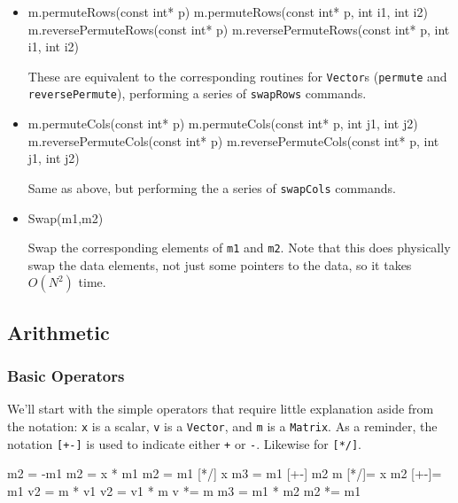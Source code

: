 \documentclass[twoside,letterpaper,11pt]{article}
\renewcommand{\tt}[1]{{\lstinline {#1}}}
\begin{document}
\begin{itemize}
\item
\begin{tmvcode}
m.permuteRows(const int* p)
m.permuteRows(const int* p, int i1, int i2)
m.reversePermuteRows(const int* p)
m.reversePermuteRows(const int* p, int i1, int i2)
\end{tmvcode}
These are equivalent to the corresponding routines for \tt{Vector}s 
(\tt{permute} and \tt{reversePermute}), performing a series of \tt{swapRows} commands.

\item
\begin{tmvcode}
m.permuteCols(const int* p)
m.permuteCols(const int* p, int j1, int j2)
m.reversePermuteCols(const int* p)
m.reversePermuteCols(const int* p, int j1, int j2)
\end{tmvcode}
Same as above, but performing the a series of \tt{swapCols} commands.

\item
\begin{tmvcode}
Swap(m1,m2)
\end{tmvcode}
Swap the corresponding elements of \tt{m1} and \tt{m2}.  Note that this does physically
swap the data elements, not just some pointers to the data, so it takes $O(N^2)$ time.

\end{itemize}

\subsection{Arithmetic}
\label{Matrix_Arithmetic}

\subsubsection{Basic Operators}

We'll start with the simple operators that require little explanation aside from the 
notation: 
\tt{x} is a scalar, \tt{v} is a \tt{Vector}, and \tt{m} is a \tt{Matrix}.  As a reminder,
the notation \tt{[+-]} is used to indicate either \tt{+} or \tt{-}.  Likewise for \tt{[*/]}.
\begin{tmvcode}
m2 = -m1
m2 = x * m1
m2 = m1 [*/] x
m3 = m1 [+-] m2
m [*/]= x
m2 [+-]= m1
v2 = m * v1
v2 = v1 * m
v *= m
m3 = m1 * m2
m2 *= m1
\end{tmvcode}
\end{document}
